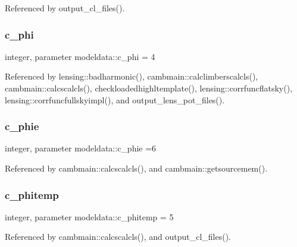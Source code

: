Referenced by output\+\_\+cl\+\_\+files().

\mbox{\label{namespacemodeldata_ae74d57bf66536040e60bd4e100a29a78}} 
\subsubsection{\texorpdfstring{c\+\_\+phi}{c\_phi}}
{\footnotesize\ttfamily integer, parameter modeldata\+::c\+\_\+phi = 4}



Referenced by lensing\+::badharmonic(), cambmain\+::calclimberscalcls(), cambmain\+::calcscalcls(), checkloadedhighltemplate(), lensing\+::corrfuncflatsky(), lensing\+::corrfuncfullskyimpl(), and output\+\_\+lens\+\_\+pot\+\_\+files().

\mbox{\label{namespacemodeldata_a0b2ffa13b78be0e1097e0696f61b3d67}} 
\subsubsection{\texorpdfstring{c\+\_\+phie}{c\_phie}}
{\footnotesize\ttfamily integer, parameter modeldata\+::c\+\_\+phie =6}



Referenced by cambmain\+::calcscalcls(), and cambmain\+::getsourcemem().

\mbox{\label{namespacemodeldata_a55f3705dd9a17416caa44b692f8bd38c}} 
\subsubsection{\texorpdfstring{c\+\_\+phitemp}{c\_phitemp}}
{\footnotesize\ttfamily integer, parameter modeldata\+::c\+\_\+phitemp = 5}



Referenced by cambmain\+::calcscalcls(), and output\+\_\+cl\+\_\+files().

\mbox{\label{namespacemodeldata_ab144c0dde977b1695db87bc0a2eb3906}} 
